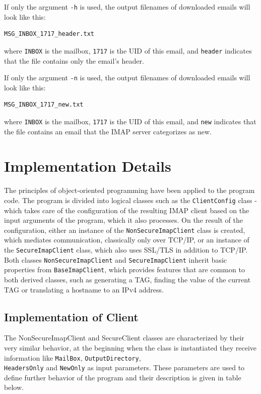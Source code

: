 \documentclass[a4paper,11pt]{article}
\begin{document}
If only the argument \texttt{-h} is used, the output filenames of downloaded emails will look like this:
\begin{verbatim}
MSG_INBOX_1717_header.txt
\end{verbatim}
where \texttt{INBOX} is the mailbox, \texttt{1717} is the UID of this email, and \texttt{header} indicates that the file contains only the email's header.

If only the argument \texttt{-n} is used, the output filenames of downloaded emails will look like this:
\begin{verbatim}
MSG_INBOX_1717_new.txt
\end{verbatim}
where \texttt{INBOX} is the mailbox, \texttt{1717} is the UID of this email, and \texttt{new} indicates that the file contains an email that the IMAP server categorizes as new.


\section{Implementation Details}
The principles of object-oriented programming have been applied to the program code. The program is 
divided into logical classes such as the \verb!ClientConfig! class - which takes care of the configuration 
of the resulting IMAP client based on the input arguments of the program, which it also processes. 
On the result of the configuration, either an instance of the \verb!NonSecureImapClient! class is created, 
which mediates communication, classically only over TCP/IP, or an instance of the \verb!SecureImapClient! 
class, which also uses SSL/TLS in addition to TCP/IP. Both classes \verb!NonSecureImapClient! and 
\verb!SecureImapClient! inherit basic properties from \verb!BaseImapClient!, which provides features 
that are common to both derived classes, such as generating a TAG, finding the value of the current TAG or translating 
a hostname to an IPv4 address.\cite{openssl_tutorial}

\subsection{Implementation of Client}
The NonSecureImapClient and SecureClient classes are characterized by their very 
similar behavior, at the beginning when the class is instantiated they receive information 
like \verb!MailBox!, \verb!OutputDirectory!, \\ 
\verb!HeadersOnly! and \verb!NewOnly! as input parameters. These parameters are used to define 
further behavior of the program and their description is given in table below.
\end{document}
